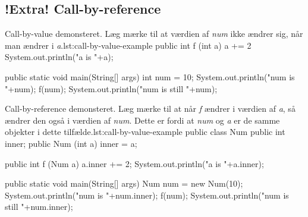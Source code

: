 

    \subsection{!Extra! Call-by-reference}



        \begin{JavaCode}{Call-by-value demonsteret. Læg mærke til at værdien af \emph{num} ikke ændrer sig, når man ændrer i \emph{a}.}{lst:call-by-value-example}
            public int f (int a) {
                a += 2
                System.out.println("a is "+a);
            }

            public static void main(String[] args) {
                int num = 10;
                System.out.println("num is "+num);
                f(num);
                System.out.println("num is still "+num);
            }
        \end{JavaCode}

        \begin{JavaCode}{Call-by-reference demonsteret. Læg mærke til at når \emph{f} ændrer i værdien af \emph{a}, så ændrer den også i værdien af \emph{num}. Dette er fordi at \emph{num} og \emph{a} er de samme objekter i dette tilfælde.}{lst:call-by-value-example}
            public class Num {
                public int inner;
                public Num (int a) { inner = a; }
            }

            public int f (Num a) {
                a.inner += 2;
                System.out.println("a is "+a.inner);
            }

            public static void main(String[] args) {
                Num num = new Num(10);
                System.out.println("num is "+num.inner);
                f(num);
                System.out.println("num is still "+num.inner);
            }
        \end{JavaCode}

